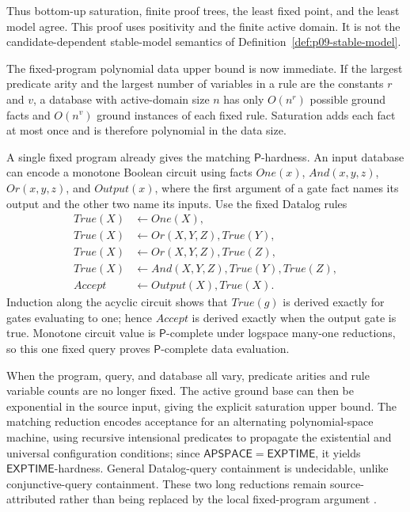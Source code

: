 Thus bottom-up saturation, finite proof trees, the least fixed point, and the
least model agree.  This proof uses positivity and the finite active domain.
It is not the candidate-dependent stable-model semantics of
Definition~\ref{def:p09-stable-model}.

The fixed-program polynomial data upper bound is now immediate.  If the largest
predicate arity and the largest number of variables in a rule are the constants
\(r\) and \(v\), a database with active-domain size \(n\) has only
\(O(n^r)\) possible ground facts and \(O(n^v)\) ground instances of each fixed
rule.  Saturation adds each fact at most once and is therefore polynomial in
the data size.

A single fixed program already gives the matching \(\mathsf P\)-hardness.  An
input database can encode a monotone Boolean circuit using facts
\(One(x)\), \(And(x,y,z)\), \(Or(x,y,z)\), and \(Output(x)\), where the first
argument of a gate fact names its output and the other two name its inputs.  Use
the fixed Datalog rules
\[
\begin{aligned}
 True(X)&\leftarrow One(X),\\
 True(X)&\leftarrow Or(X,Y,Z),True(Y),\\
 True(X)&\leftarrow Or(X,Y,Z),True(Z),\\
 True(X)&\leftarrow And(X,Y,Z),True(Y),True(Z),\\
 Accept&\leftarrow Output(X),True(X).
\end{aligned}
\]
Induction along the acyclic circuit shows that \(True(g)\) is derived exactly
for gates evaluating to one; hence \(Accept\) is derived exactly when the output
gate is true.  Monotone circuit value is \(\mathsf P\)-complete under logspace
many-one reductions, so this one fixed query proves \(\mathsf P\)-complete data
evaluation.

When the program, query, and database all vary, predicate arities and rule
variable counts are no longer fixed.  The active ground base can then be
exponential in the source input, giving the explicit saturation upper bound.
The matching reduction encodes acceptance for an alternating
polynomial-space machine, using recursive intensional predicates to propagate
the existential and universal configuration conditions; since
\(\mathsf{APSPACE}=\mathsf{EXPTIME}\), it yields
\(\mathsf{EXPTIME}\)-hardness.  General Datalog-query containment is
undecidable, unlike conjunctive-query containment.  These two long reductions
remain source-attributed rather than being replaced by the local fixed-program
argument
\cite[chs.~12--16]{AbiteboulHullVianu1995}
\cite{DantsinEiterGottlobVoronkov2001}.

